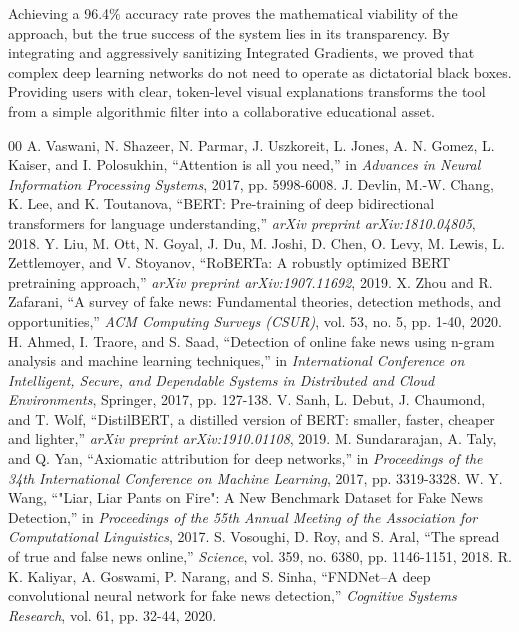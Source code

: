 \documentclass[conference]{IEEEtran}
\begin{document}
Achieving a 96.4\% accuracy rate proves the mathematical viability of the approach, but the true success of the system lies in its transparency. By integrating and aggressively sanitizing Integrated Gradients, we proved that complex deep learning networks do not need to operate as dictatorial black boxes. Providing users with clear, token-level visual explanations transforms the tool from a simple algorithmic filter into a collaborative educational asset.

\begin{thebibliography}{00}
 A. Vaswani, N. Shazeer, N. Parmar, J. Uszkoreit, L. Jones, A. N. Gomez, L. Kaiser, and I. Polosukhin, ``Attention is all you need,'' in \textit{Advances in Neural Information Processing Systems}, 2017, pp. 5998-6008.
 J. Devlin, M.-W. Chang, K. Lee, and K. Toutanova, ``BERT: Pre-training of deep bidirectional transformers for language understanding,'' \textit{arXiv preprint arXiv:1810.04805}, 2018.
 Y. Liu, M. Ott, N. Goyal, J. Du, M. Joshi, D. Chen, O. Levy, M. Lewis, L. Zettlemoyer, and V. Stoyanov, ``RoBERTa: A robustly optimized BERT pretraining approach,'' \textit{arXiv preprint arXiv:1907.11692}, 2019.
 X. Zhou and R. Zafarani, ``A survey of fake news: Fundamental theories, detection methods, and opportunities,'' \textit{ACM Computing Surveys (CSUR)}, vol. 53, no. 5, pp. 1-40, 2020.
 H. Ahmed, I. Traore, and S. Saad, ``Detection of online fake news using n-gram analysis and machine learning techniques,'' in \textit{International Conference on Intelligent, Secure, and Dependable Systems in Distributed and Cloud Environments}, Springer, 2017, pp. 127-138.
 V. Sanh, L. Debut, J. Chaumond, and T. Wolf, ``DistilBERT, a distilled version of BERT: smaller, faster, cheaper and lighter,'' \textit{arXiv preprint arXiv:1910.01108}, 2019.
 M. Sundararajan, A. Taly, and Q. Yan, ``Axiomatic attribution for deep networks,'' in \textit{Proceedings of the 34th International Conference on Machine Learning}, 2017, pp. 3319-3328.
 W. Y. Wang, ``"Liar, Liar Pants on Fire": A New Benchmark Dataset for Fake News Detection,'' in \textit{Proceedings of the 55th Annual Meeting of the Association for Computational Linguistics}, 2017.
 S. Vosoughi, D. Roy, and S. Aral, ``The spread of true and false news online,'' \textit{Science}, vol. 359, no. 6380, pp. 1146-1151, 2018.
 R. K. Kaliyar, A. Goswami, P. Narang, and S. Sinha, ``FNDNet--A deep convolutional neural network for fake news detection,'' \textit{Cognitive Systems Research}, vol. 61, pp. 32-44, 2020.

\end{thebibliography}
\end{document}
